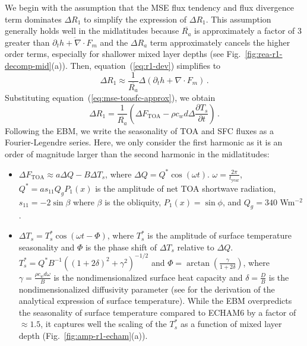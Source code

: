 \documentclass{ametsocV5}
\begin{document}
\appendix[E]
      We begin with the assumption that the MSE flux tendency and flux divergence term dominates $\Delta R_1$ to simplify the expression of $\Delta R_1$. This assumption generally holds well in the midlatitudes because $\overline{R_a}$ is approximately a factor of 3 greater than $\overline{\partial_t h + \nabla\cdot F_m}$ and the $\Delta R_a$ term approximately cancels the higher order terms, especially for shallower mixed layer depths (see Fig.~\ref{fig:rea-r1-decomp-mid}(a)). Then, equation~(\ref{eq:r1-dev}) simplifies to
      \begin{equation} \label{eq:r1-term1}
        \Delta R_{1} \approx \frac{1}{\overline{R_{a}}}\Delta(\partial_t h + \nabla\cdot F_{m}) \, .
      \end{equation}
      Substituting equation~(\ref{eq:mse-toasfc-approx}), we obtain
      \begin{equation} \label{eq:r1-linear2}
        \Delta R_{1} = \frac{1}{\overline{R_{a}}}\left(\Delta F_{\mathrm{TOA}}-\rho c_{w} d \Delta\frac{\partial T_{s}}{\partial t}\right) \, .
      \end{equation}
      Following the \cite{rose2017} EBM, we write the seasonality of TOA and SFC fluxes as a Fourier-Legendre series. Here, we only consider the first harmonic as it is an order of magnitude larger than the second harmonic in the midlatitudes:
          \begin{itemize}
            \item $\Delta F_{\mathrm{TOA}} \approx a\Delta Q - B\Delta T_{s}$, where $\Delta Q = Q^{*}\cos(\omega t)$. $\omega=\frac{2\pi}{t_{\mathrm{year}}}$, $Q^{*}=as_{11}Q_{g}P_{1}(x)$ is the amplitude of net TOA shortwave radiation, $s_{11}=-2\sin{\beta}$ where $\beta$ is the obliquity, $P_1(x) = \sin\phi$, and $Q_{g}=340$ Wm$^{-2}$. 
            \item $\Delta T_{s} = T_{s}^{*}\cos(\omega t - \Phi)$, where $T_{s}^{*}$ is the amplitude of surface temperature seasonality and $\Phi$ is the phase shift of $\Delta T_{s}$ relative to $\Delta Q$. $T_{s}^{*}=Q^{*}B^{-1}\left((1+2\delta)^{2}+\gamma^{2}\right)^{-1/2}$ and $\Phi=\arctan\left(\frac{\gamma}{1+2\delta}\right)$, where $\gamma=\frac{\rho c_w d\omega}{B}$ is the nondimensionalized surface heat capacity and $\delta = \frac{D}{B}$ is the nondimensionalized diffusivity parameter (see \cite{rose2017} for the derivation of the analytical expression of surface temperature). While the EBM overpredicts the seasonality of surface temperature compared to ECHAM6 by a factor of $\approx 1.5$, it captures well the scaling of the $T_s^*$ as a function of mixed layer depth (Fig.~\ref{fig:amp-r1-echam}(a)).
          \end{itemize}
\end{document}
